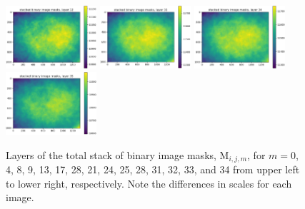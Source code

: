 \documentclass[letterpaper,11pt]{article}
\newcommand{\Mu}{\mathrm{M}}
\begin{document}
\begin{figure}[!ht]
\includegraphics[width=0.3\textwidth]{images/measuring_flatfield_corrections/mask_stack_layers/mask_stack_layer_32}
\includegraphics[width=0.3\textwidth]{images/measuring_flatfield_corrections/mask_stack_layers/mask_stack_layer_33}
\includegraphics[width=0.3\textwidth]{images/measuring_flatfield_corrections/mask_stack_layers/mask_stack_layer_34}
\includegraphics[width=0.3\textwidth]{images/measuring_flatfield_corrections/mask_stack_layers/mask_stack_layer_35}
\caption{\footnotesize Layers of the total stack of binary image masks, $\Mu_{i,j,m}$, for $m=$0, 4, 8, 9, 13, 17, 28, 21, 24, 25, 28, 31, 32, 33, and 34 from upper left to lower right, respectively. Note the differences in scales for each image.}
\label{fig:mask_stack_layers}
\end{figure}
\end{document}
